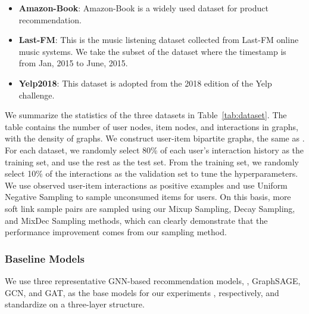 \begin{itemize}
    \item \textbf{Amazon-Book}\cite{amazon}: Amazon-Book is a widely used dataset for product recommendation.
    \item \textbf{Last-FM}\cite{last-fm}: This is the music listening dataset collected from Last-FM online music systems. We take the subset of the dataset where the timestamp is from Jan, 2015 to June, 2015. 
    \item \textbf{Yelp2018}\cite{yelp}: This dataset is adopted from the 2018 edition of the Yelp challenge. %
\end{itemize}

We summarize the statistics of the three datasets in Table~\ref{tab:dataset}. 
The table contains the number of  user nodes, item nodes, and interactions in graphs, with the density of graphs. We construct user-item bipartite graphs, the same as \cite{pinsage, wang2019kgat, huang2021mixgcf}.
For each dataset, we randomly select 80\% of each user's interaction history as the training set, and use the rest as the test set. From the training set, we randomly select 10\% of the interactions as the validation set to tune the hyperparameters. 
We use observed user-item interactions as positive examples and use Uniform Negative Sampling to sample unconsumed items for users.
On this basis, more soft link sample pairs are sampled using our Mixup Sampling, Decay Sampling, and MixDec Sampling methods, which can clearly demonstrate that the performance improvement comes from our sampling method.

\subsubsection{\textbf{Baseline Models}}

We use three representative GNN-based recommendation models, \ie, GraphSAGE, GCN, and GAT, as the base models for our experiments \cite{wu2020gnnsurvey}, respectively, and standardize on a three-layer structure.


